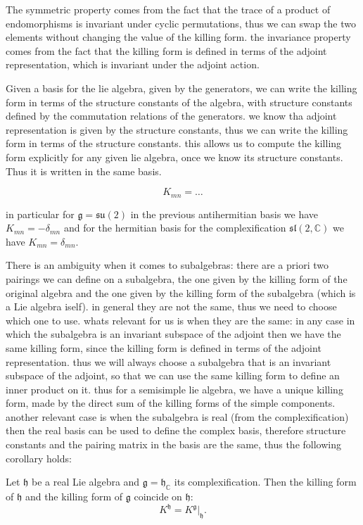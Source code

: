 The symmetric property comes from the fact that the trace of a product of endomorphisms is invariant under cyclic permutations, thus we can swap the two elements without changing the value of the killing form. the invariance property comes from the fact that the killing form is defined in terms of the adjoint representation, which is invariant under the adjoint action.

Given a basis for the lie algebra, given by the generators, we can write the killing form in terms of the structure constants of the algebra, with structure constants defined by the commutation relations of the generators. we know tha adjoint representation is given by the structure constants, thus we can write the killing form in terms of the structure constants. this allows us to compute the killing form explicitly for any given lie algebra, once we know its structure constants. Thus it is written in the same basis.

\[
    K_{mn} = \dots
\]

in particular for \(\mathfrak{g} = \mathfrak{su}(2)\) in the previous antihermitian basis we have \(K_{mn} = -\delta_{mn}\) and for the hermitian basis for the complexification \(\mathfrak{sl}(2,\mathbb{C})\)  we have \(K_{mn} = \delta_{mn}\).

There is an ambiguity when it comes to subalgebras: there are a priori two pairings we can define on a subalgebra, the one given by the killing form of the original algebra and the one given by the killing form of the subalgebra (which is a Lie algebra iself). in general they are not the same, thus we need to choose which one to use. whats relevant for us is when they are the same: in any case in which the subalgebra is an invariant subspace of the adjoint then we have the same killing form, since the killing form is defined in terms of the adjoint representation. thus we will always choose a subalgebra that is an invariant subspace of the adjoint, so that we can use the same killing form to define an inner product on it.
thus for a semisimple lie algebra, we have a unique killing form, made by the direct sum of the killing forms of the simple components.
another relevant case is when the subalgebra is real (from the complexification) then the real basis can be used to define the complex basis, therefore structure constants and the pairing matrix in the basis are the same, thus the following corollary holds:

\begin{corollary}
    Let \(\mathfrak{h}\) be a real Lie algebra and \(\mathfrak{g} = \mathfrak{h}_{\mathbb{C}}\) its complexification. Then the killing form of \(\mathfrak{h}\) and the killing form of \(\mathfrak{g}\) coincide on \(\mathfrak{h}\):
    \[
        K^{\mathfrak{h}} = K^{\mathfrak{g}} \big|_\mathfrak{h}.
    \]
\end{corollary}


